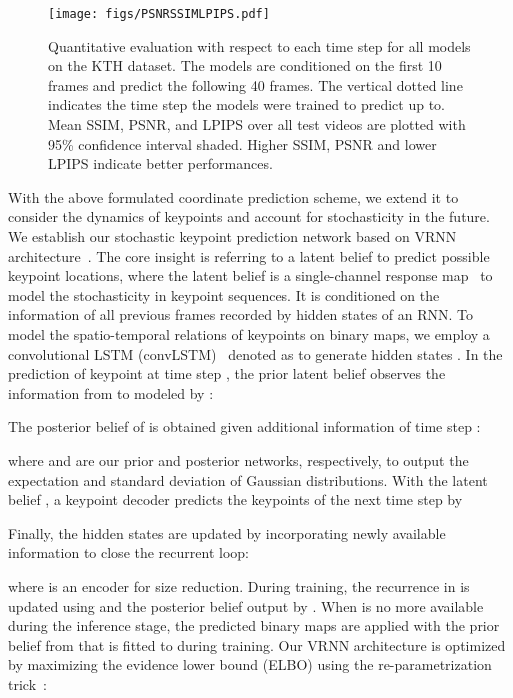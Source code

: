 \documentclass[letterpaper, 10 pt, conference]{ieeeconf}
\begin{document}
\begin{figure*}[t]
	\texttt{[image: figs/PSNRSSIMLPIPS.pdf]}
	\centering
	\caption{Quantitative evaluation with respect to each time step for all models on the KTH dataset. 
		The	models are conditioned on the first 10 frames and predict the following 40 frames.
		The vertical dotted line indicates the time step the models were trained to predict up to. 
		Mean SSIM, PSNR, and LPIPS over all test videos are
		plotted with 95\% confidence interval shaded. 
		Higher SSIM, PSNR and lower LPIPS indicate better performances.
}
	\label{fig:kth_perframe}
	\vspace{-5mm}
\end{figure*}


With the above formulated coordinate prediction scheme, we extend it to consider the dynamics of keypoints and account for stochasticity in the future.
We establish our stochastic keypoint prediction network based on VRNN architecture~\cite{chung2015recurrent}.
The core insight is referring to a latent belief  to predict possible keypoint locations, where the latent belief  is a single-channel response map~\cite{babaeizadeh2018stochastic} to model the stochasticity in keypoint sequences.
It is conditioned on the information of all previous frames recorded by hidden states of an RNN.
To model the spatio-temporal relations of keypoints on binary maps, we employ a convolutional LSTM (convLSTM)~\cite{shi2015convolutional} denoted as  to generate hidden states .
In the prediction of keypoint at time step , the prior latent belief  observes the information from  to  modeled by :

The posterior belief of  is obtained given additional information of time step :
 
where  and  are our prior and posterior networks, respectively, to output the expectation and standard deviation of Gaussian distributions. 
With the latent belief , a keypoint decoder  predicts the keypoints of the next time step by

Finally, the hidden states are updated by incorporating newly available information to close the recurrent loop:

where  is an encoder for size reduction.
During training, the recurrence in  is updated using  and the posterior belief output by . 
When  is no more available during the inference stage, the predicted binary maps  are applied with the prior belief from  that is fitted to  during training.
Our VRNN architecture is optimized by maximizing the evidence lower bound (ELBO) using the re-parametrization trick~\cite{kingma2013auto}:
\end{document}
